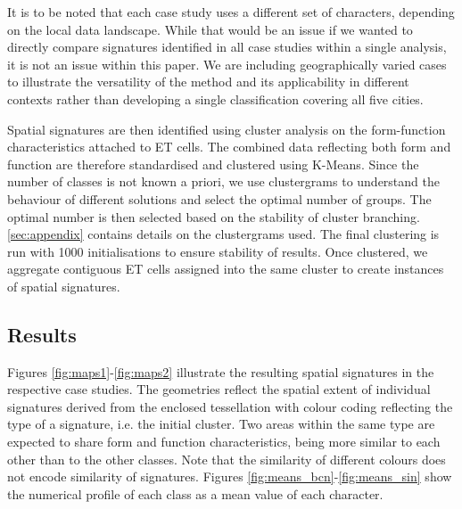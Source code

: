 It is to be noted that each case study uses a different set of characters, depending on
the local data landscape. While that would be an issue if we wanted to directly compare
signatures identified in all case studies within a single analysis, it is not an issue
within this paper. We are including geographically varied cases to illustrate the
versatility of the method and its applicability in different contexts rather than
developing a single classification covering all five cities.


Spatial signatures are then identified using cluster analysis on the
form-function characteristics attached to ET cells.
The combined data reflecting both form and function are therefore standardised and
clustered using K-Means. Since the number of classes is not known a priori,
we use clustergrams \citep{schonlau2002clustergram} to understand the
behaviour of different solutions and select the optimal number of groups.
The optimal number is then selected based on the stability of cluster branching.
\ref{sec:appendix} contains details on the clustergrams used.
The final clustering is run with 1000 initialisations to ensure stability of
results.
Once clustered, we
aggregate contiguous ET cells assigned into the same cluster to
create instances of spatial signatures.


\subsection{Results}

Figures \ref{fig:maps1}-\ref{fig:maps2} illustrate the resulting spatial signatures in the respective case
studies. The geometries reflect the spatial extent of individual signatures
derived from the enclosed tessellation
with colour coding reflecting the type of a signature, i.e. the initial cluster. Two
areas within the same type are expected to share form and function characteristics, being more similar to each other than to the
other classes. Note that the similarity of different colours does not encode
similarity of signatures. Figures \ref{fig:means_bcn}-\ref{fig:means_sin} show the numerical
profile of each class as a mean value of each character.

